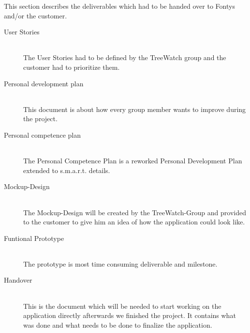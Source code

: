 This section describes the deliverables which had to be handed over to Fontys and/or the customer.
\begin{description}
	\item[User Stories] \hfill \\
	The User Stories had to be defined by the TreeWatch group and the customer had to prioritize them.
	\item[Personal development plan] \hfill \\
	This document is about how every group member wants to improve during the project.
	\item[Personal competence plan] \hfill \\
	The Personal Competence Plan is a reworked Personal Development Plan extended to s.m.a.r.t. details.
	\item[Mockup-Design] \hfill \\
	The Mockup-Design will be created by the TreeWatch-Group and provided to the customer to give him an idea of how the application could look like.
	\item[Funtional Prototype] \hfill \\
	The prototype is most time consuming deliverable and milestone. 
	\item[Handover] \hfill \\
	This is the document which will be needed to start working on the application directly afterwards we finished the project. It contains what was done and what needs to be done to finalize the application.
\end{description}
